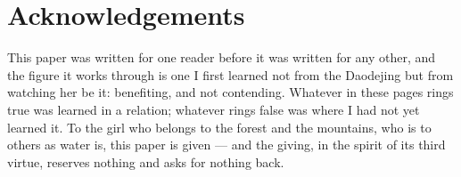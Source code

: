 \section*{Acknowledgements}

\noindent
This paper was written for one reader before it was written for any other, and the figure it works through is one I first learned not from the Daodejing but from watching her be it: benefiting, and not contending. Whatever in these pages rings true was learned in a relation; whatever rings false was where I had not yet learned it. To the girl who belongs to the forest and the mountains, who is to others as water is, this paper is given --- and the giving, in the spirit of its third virtue, reserves nothing and asks for nothing back.

